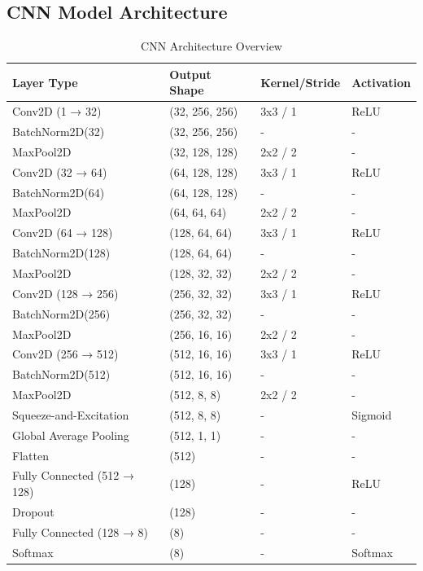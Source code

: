 \documentclass[conference]{IEEEtran}
\begin{document}
\subsection{CNN Model Architecture} \label{app:cnn-architecture}
\begin{table}[htbp]
    \centering
    \caption{CNN Architecture Overview}
    \begin{tabular}{llll}
        \toprule
        \textbf{Layer Type} & \textbf{Output Shape} & \textbf{Kernel/Stride} & \textbf{Activation} \\
        \midrule
        Conv2D (1 → 32) & (32, 256, 256) & 3x3 / 1 & ReLU \\
        BatchNorm2D(32) & (32, 256, 256) & - & - \\
        MaxPool2D & (32, 128, 128) & 2x2 / 2 & - \\
        Conv2D (32 → 64) & (64, 128, 128) & 3x3 / 1 & ReLU \\
        BatchNorm2D(64) & (64, 128, 128) & - & - \\
        MaxPool2D & (64, 64, 64) & 2x2 / 2 & - \\
        Conv2D (64 → 128) & (128, 64, 64) & 3x3 / 1 & ReLU \\
        BatchNorm2D(128) & (128, 64, 64) & - & - \\
        MaxPool2D & (128, 32, 32) & 2x2 / 2 & - \\
        Conv2D (128 → 256) & (256, 32, 32) & 3x3 / 1 & ReLU \\
        BatchNorm2D(256) & (256, 32, 32) & - & - \\
        MaxPool2D & (256, 16, 16) & 2x2 / 2 & - \\
        Conv2D (256 → 512) & (512, 16, 16) & 3x3 / 1 & ReLU \\
        BatchNorm2D(512) & (512, 16, 16) & - & - \\
        MaxPool2D & (512, 8, 8) & 2x2 / 2 & - \\
        Squeeze-and-Excitation & (512, 8, 8) & - & Sigmoid \\
        Global Average Pooling & (512, 1, 1) & - & - \\
        Flatten & (512) & - & - \\
        Fully Connected (512 → 128) & (128) & - & ReLU \\
        Dropout & (128) & - & - \\
        Fully Connected (128 → 8) & (8) & - & - \\
        Softmax & (8) & - & Softmax \\
        \bottomrule
    \end{tabular}
    \label{tab:cnn_architecture_simple}
\end{table}
\end{document}
